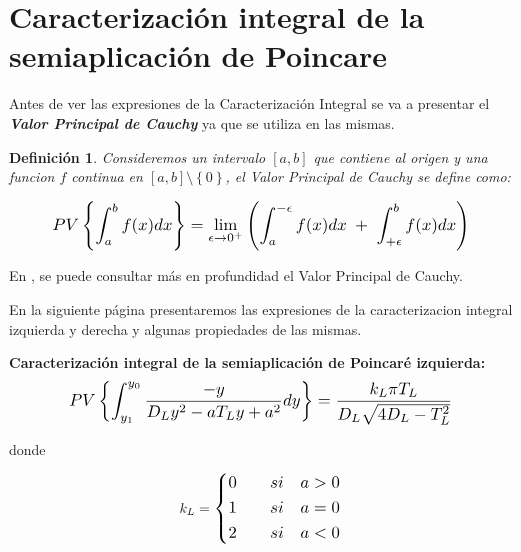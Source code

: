\documentclass[12pt,a4paper]{report} %
\newtheorem{definicion}{Definición}[chapter] %
\begin{document}
	\section{Caracterización integral de la semiaplicación de Poincare}
	\label{sec41}
	
	\vspace{0.5cm} Antes de ver las expresiones de la Caracterización Integral se va a presentar el \textit{\textbf{Valor Principal de Cauchy}} ya que se utiliza en las mismas.
	\begin{definicion}
	
	 Consideremos un intervalo $[a,b]$ que contiene al origen y una funcion $f$ continua en $[a,b] \setminus \left\{0\right\}$, el Valor Principal de Cauchy se define como:
	
	\begin{equation}
		\scalebox{1.2}{$\displaystyle
			PV\left\{\int_{a}^{b}f(x)dx\right\}= \lim_{\epsilon \to 0^+}\left(
			\int_{a}^{-\epsilon}f(x)dx \; + \; 
			\int_{+\epsilon}^{b}f(x)dx
			\right)
			$}
	\end{equation}\smallskip
	
    \end{definicion}
    
	\noindent En \cite{caracterizacion},\cite{pv} se puede consultar más en profundidad el Valor Principal de Cauchy.
	
	\vspace{1cm} En la siguiente página presentaremos las expresiones de la caracterizacion integral izquierda y derecha y algunas propiedades de las mismas.
	
	\newpage
	
	\vspace{0.5cm}\noindent \textbf{Caracterización integral de la semiaplicación de Poincaré izquierda:}
	\begin{equation}
		\label{eq:caracl}
		\scalebox{1.2}{$\displaystyle
			PV\left\{\int_{y_1}^{y_0}\frac{-y}{D_Ly^2-aT_Ly+a^2}dy\right\}=\frac{k_L\pi T_L}{D_L\sqrt{4D_L-T_L^2}}
			$}
	\end{equation}\smallskip
	
	\noindent donde
	
	\begin{equation*}
		k_L=
		\label{eq:kl}
		\scalebox{1.2}{$\displaystyle
			\left\{
			\begin{aligned}
				0 \qquad si \quad a>0 \\
				1 \qquad si \quad a=0 \\
				2 \qquad si \quad a<0 
			\end{aligned}
			\right. 
			$}
	\end{equation*}\smallskip
	
\end{document}
